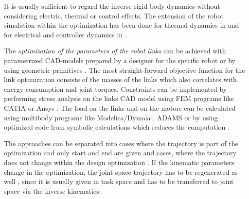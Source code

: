\documentclass{svproc}
\begin{document}
It is usually sufficient to regard the inverse rigid body dynamics without considering electric, thermal or control effects.
The extension of the robot simulation within the optimization has been done for thermal dynamics in \cite{ChedmailGau1990} and for electrical and controller dynamics in \cite{Padilla-GarciaCruRod2015}.


The \emph{optimization of the parameters of the robot links} can be achieved with parametrized CAD-models prepared by a designer for the specific robot \cite{TarkianPerOelFen2011,ZhouBai2015} or by using geometric primitives \cite{RamirezKotOrt2017}. %
The most straight-forward objective function for the link optimization consists of the masses of the links which also correlates with energy consumption and joint torques.
Constraints can be implemented by performing stress analysis on the links CAD model using FEM programs like CATIA \cite{TarkianPerOelFen2011} or Ansys \cite{ZhouBai2015}.
The load on the links and on the motors can be calculated using multibody programs like Modelica/Dymola \cite{TarkianPerOelFen2011}, ADAMS \cite{ZhouBaiHan2011} or by using optimized code from symbolic calculations \cite{ChedmailGau1990} which reduces the computation \cite{KhalilDom2002}.

The approaches can be separated into cases where the trajectory is part of the optimization and only start and end are given \cite{PetterssonAndKru2005,PetterssonOel2009,TarkianPerOelFen2011} and cases, where the trajectory does not change within the design optimization \cite{TarkianPerOelFen2011,ZhouBaiHan2011,Padilla-GarciaCruRod2015}.
If the kinematic parameters change in the optimization, the joint space trajectory has to be regenerated as well \cite{TarkianLunOel2008,ZhouBai2015}, since it is usually given in task space and has to be transferred to joint space via the inverse kinematics.
\end{document}
